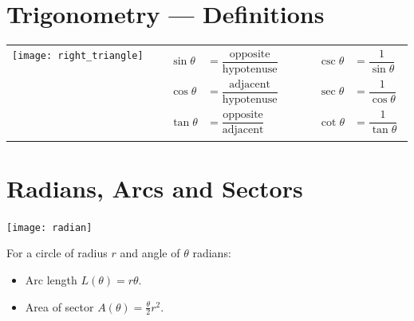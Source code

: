 \section{Trigonometry --- Definitions}
\begin{center}
\begin{tabular}{m{6cm}cm{8cm}}
  \texttt{[image: right\_triangle]} & \qquad&
$
\begin{array}{rlcrl}
\sin\theta &= \dfrac{\text{opposite}}{\text{hypotenuse}} & \qquad & \csc \theta &= \dfrac{1}{\sin\theta} \\[3ex]
\cos\theta &= \dfrac{\text{adjacent}}{\text{hypotenuse}} & \qquad & \sec \theta &= \dfrac{1}{\cos\theta} \\[3ex]
\tan\theta &= \dfrac{\text{opposite}}{\text{adjacent}} & \qquad & \cot \theta &= \dfrac{1}{\tan\theta}
\end{array}
$
\end{tabular}
\end{center}
\section{Radians, Arcs and Sectors}\label{app rad arc sec}
\begin{center}
 \texttt{[image: radian]}
\end{center}
For a circle of radius $r$ and angle of $\theta$ radians:
\begin{itemize}
 \item Arc length $L(\theta) = r \theta$.
 \item Area of sector $A(\theta) = \frac{\theta}{2} r^2$.
\end{itemize}


